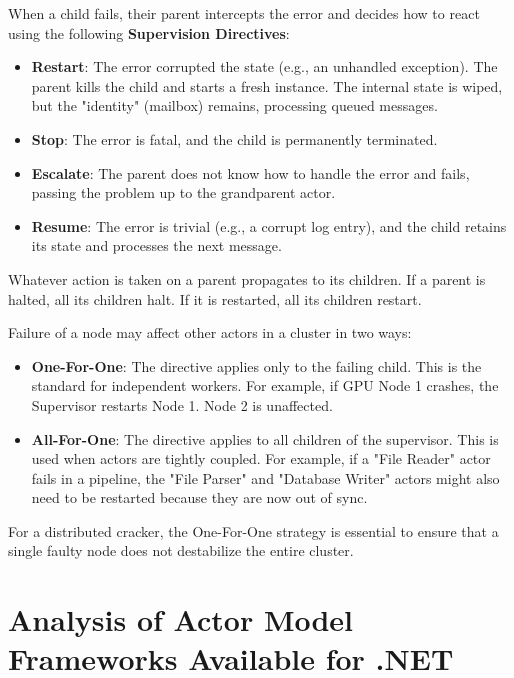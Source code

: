 When a child fails, their parent intercepts the error and decides how to react using the following \textbf{Supervision Directives}: 

\begin{itemize}
    \item \textbf{Restart}: The error corrupted the state (e.g., an unhandled exception). The parent kills the child and starts a fresh instance. The internal state is wiped, but the "identity" (mailbox) remains, processing queued messages.
    
    \item \textbf{Stop}: The error is fatal, and the child is permanently terminated.
    
    \item \textbf{Escalate}: The parent does not know how to handle the error and fails, passing the problem up to the grandparent actor.
    
    \item \textbf{Resume}: The error is trivial (e.g., a corrupt log entry), and the child retains its state and processes the next message.
\end{itemize}

Whatever action is taken on a parent propagates to its children. If a parent is halted, all its children halt. If it is restarted, all its children restart.

Failure of a node may affect other actors in a cluster in two ways:

\begin{itemize}
    \item \textbf{One-For-One}: The directive applies only to the failing child. This is the standard for independent workers. For example, if GPU Node 1 crashes, the Supervisor restarts Node 1. Node 2 is unaffected.

    \item \textbf{All-For-One}: The directive applies to all children of the supervisor. This is used when actors are tightly coupled. For example, if a "File Reader" actor fails in a pipeline, the "File Parser" and "Database Writer" actors might also need to be restarted because they are now out of sync.
\end{itemize}

For a distributed cracker, the One-For-One strategy is essential to ensure that a single faulty node does not destabilize the entire cluster.



\section{Analysis of Actor Model Frameworks Available for .NET}

